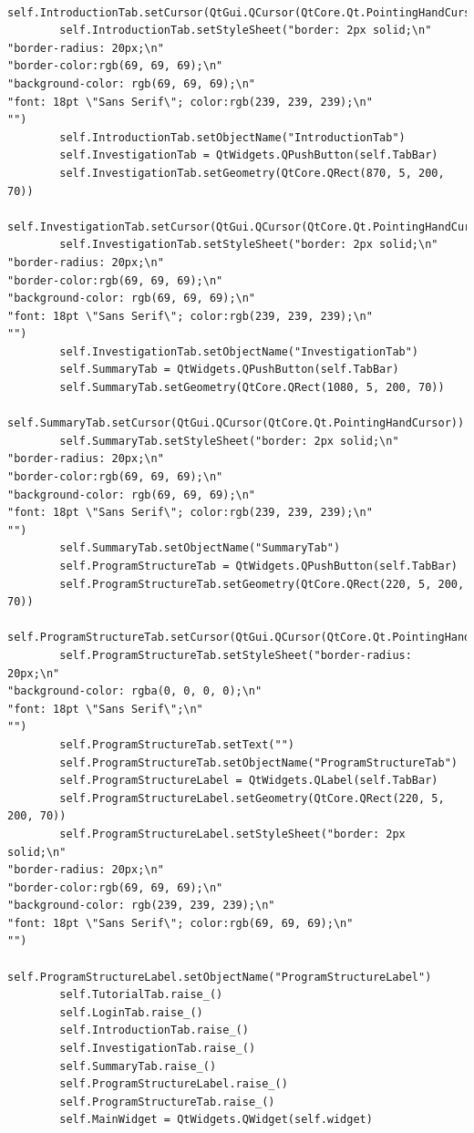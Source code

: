 \documentclass{article}
\begin{document}
\begin{lstlisting}
        self.IntroductionTab.setCursor(QtGui.QCursor(QtCore.Qt.PointingHandCursor))
        self.IntroductionTab.setStyleSheet("border: 2px solid;\n"
"border-radius: 20px;\n"
"border-color:rgb(69, 69, 69);\n"
"background-color: rgb(69, 69, 69);\n"
"font: 18pt \"Sans Serif\"; color:rgb(239, 239, 239);\n"
"")
        self.IntroductionTab.setObjectName("IntroductionTab")
        self.InvestigationTab = QtWidgets.QPushButton(self.TabBar)
        self.InvestigationTab.setGeometry(QtCore.QRect(870, 5, 200, 70))
        self.InvestigationTab.setCursor(QtGui.QCursor(QtCore.Qt.PointingHandCursor))
        self.InvestigationTab.setStyleSheet("border: 2px solid;\n"
"border-radius: 20px;\n"
"border-color:rgb(69, 69, 69);\n"
"background-color: rgb(69, 69, 69);\n"
"font: 18pt \"Sans Serif\"; color:rgb(239, 239, 239);\n"
"")
        self.InvestigationTab.setObjectName("InvestigationTab")
        self.SummaryTab = QtWidgets.QPushButton(self.TabBar)
        self.SummaryTab.setGeometry(QtCore.QRect(1080, 5, 200, 70))
        self.SummaryTab.setCursor(QtGui.QCursor(QtCore.Qt.PointingHandCursor))
        self.SummaryTab.setStyleSheet("border: 2px solid;\n"
"border-radius: 20px;\n"
"border-color:rgb(69, 69, 69);\n"
"background-color: rgb(69, 69, 69);\n"
"font: 18pt \"Sans Serif\"; color:rgb(239, 239, 239);\n"
"")
        self.SummaryTab.setObjectName("SummaryTab")
        self.ProgramStructureTab = QtWidgets.QPushButton(self.TabBar)
        self.ProgramStructureTab.setGeometry(QtCore.QRect(220, 5, 200, 70))
        self.ProgramStructureTab.setCursor(QtGui.QCursor(QtCore.Qt.PointingHandCursor))
        self.ProgramStructureTab.setStyleSheet("border-radius: 20px;\n"
"background-color: rgba(0, 0, 0, 0);\n"
"font: 18pt \"Sans Serif\";\n"
"")
        self.ProgramStructureTab.setText("")
        self.ProgramStructureTab.setObjectName("ProgramStructureTab")
        self.ProgramStructureLabel = QtWidgets.QLabel(self.TabBar)
        self.ProgramStructureLabel.setGeometry(QtCore.QRect(220, 5, 200, 70))
        self.ProgramStructureLabel.setStyleSheet("border: 2px solid;\n"
"border-radius: 20px;\n"
"border-color:rgb(69, 69, 69);\n"
"background-color: rgb(239, 239, 239);\n"
"font: 18pt \"Sans Serif\"; color:rgb(69, 69, 69);\n"
"")
        self.ProgramStructureLabel.setObjectName("ProgramStructureLabel")
        self.TutorialTab.raise_()
        self.LoginTab.raise_()
        self.IntroductionTab.raise_()
        self.InvestigationTab.raise_()
        self.SummaryTab.raise_()
        self.ProgramStructureLabel.raise_()
        self.ProgramStructureTab.raise_()
        self.MainWidget = QtWidgets.QWidget(self.widget)

\end{lstlisting}
\end{document}
